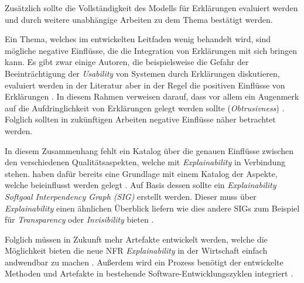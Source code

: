 Zusätzlich sollte die Vollständigkeit des Modells für Erklärungen evaluiert werden und durch weitere unabhängige Arbeiten zu dem Thema bestätigt werden.

Ein Thema, welches im entwickelten Leitfaden wenig behandelt wird, sind mögliche negative Einflüsse, die die Integration von Erklärungen mit sich bringen kann. Es gibt zwar einige Autoren, die beispielsweise die Gefahr der Beeinträchtigung der \textit{Usability} von Systemen durch Erklärungen diskutieren, evaluiert werden in der Literatur aber in der Regel die positiven Einflüsse von Erklärungen \cite{}. In diesem Rahmen verweisen \citeauthor{lim_2009_assessing} darauf, dass vor allem ein Augenmerk auf die Aufdringlichkeit von Erklärungen gelegt werden sollte (\textit{Obtrusivness}) \cite{lim_2009_assessing}. Folglich sollten in zukünftigen Arbeiten negative Einflüsse näher  betrachtet werden.

In diesem Zusammenhang fehlt ein Katalog über die genauen Einflüsse zwischen den verschiedenen Qualitätsaspekten, welche mit \textit{Explainability} in Verbindung stehen. \citeauthor{chazette_knowledge_nodate} haben dafür bereits eine Grundlage mit einem Katalog der Aspekte, welche beieinflusst werden gelegt \cite{chazette_knowledge_nodate}. Auf Basis dessen sollte ein \textit{Explainability Softgoal Interpendency Graph (SIG)} erstellt werden. Dieser muss über \textit{Explainability} einen ähnlichen Überblick liefern wie dies andere SIGs zum Beispiel für  \textit{Transparency} oder \textit{Invisibility} bieten \cite{do2010software, carvalho2020developers}.

Folglich müssen in Zukunft mehr Artefakte entwickelt werden, welche die Möglichkeit bieten die neue NFR \textit{Explainability} in der Wirtschaft einfach andwendbar zu machen \cite{sokol_explainability_2020}. Außerdem wird ein Prozess benötigt der entwickelte Methoden und Artefakte in bestehende Software-Entwicklungszyklen integriert \cite{kohl_explainability_2019, cassens_ambient_2019}.